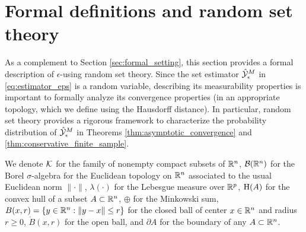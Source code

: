 \documentclass[12pt]{l4dc2022} %
\begin{document}
% 









	
% 

% 







\newpage
\appendix
\section{Formal definitions and random set theory}\label{apdx:random_set_theory}

As a complement to Section \ref{sec:formal_setting}, this section provides a formal description of $\epsilon$-\randup using random set theory. 
Since the set estimator $\hat{\mathcal{Y}}^M_{\epsilon}$ in \eqref{eq:estimator_eps} is a random variable, describing its measurability properties is important to formally analyze its convergence properties (in an appropriate topology, which we define using the Hausdorff distance). 
In particular, random set theory provides a rigorous framework to characterize the probability distribution of $\hat{\mathcal{Y}}^M_{\epsilon}$ in Theorems \ref{thm:asymptotic_convergence} and \ref{thm:conservative_finite_sample}. 





We denote 
 $\mathcal{K}$ for the family of nonempty compact subsets of $\mathbb{R}^n$, 
$\mathcal{B}(\mathbb{R}^n)$ for the Borel $\sigma$-algebra for the Euclidean topology on $\mathbb{R}^n$ associated to the usual Euclidean norm $\|\cdot\|$, 
$\lambda(\cdot)$ for the Lebesgue measure over $\mathbb{R}^p$, 
% 
% 
$\textrm{H}(A)$ for the convex hull of a subset $A\subset\mathbb{R}^n$, 
$\oplus$ for the Minkowski sum, 
$B(x,r)=\{y\in\mathbb{R}^n: \|y-x\|\leq r\}$ for the closed ball of center $x\in\mathbb{R}^n$ and radius $r\geq 0$, 
$\mathring{B}(x,r)$ for the open ball,  
and 
$\partial A$ for the boundary of any $A\subset\mathbb{R}^n$. 
\end{document}
